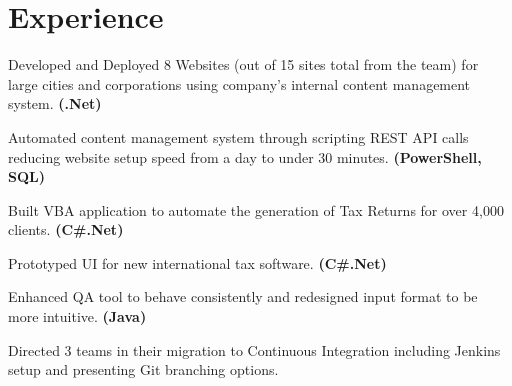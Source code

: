 \documentclass[letterpaper]{kevin-resume} %
\begin{document}
\hfill
%
%
\begin{minipage}[t]{0.66\textwidth} %


\section{Experience}

\vspace{\topsep} %
\begin{tightitemize}
	\item Developed and Deployed 8 Websites (out of 15 sites total from the team) for large cities and corporations using company's internal content management system. \textbf{(.Net)}
	\item Automated content management system through scripting REST API calls reducing website setup speed from a day to under 30 minutes. \textbf{(PowerShell, SQL)}
\end{tightitemize}

\sectionspace %


\begin{tightitemize}
	\item Built VBA application to automate the generation of Tax Returns for over 4,000 clients. \textbf{(C\#.Net)}
	\item Prototyped UI for new international tax software. \textbf{(C\#.Net)}
\end{tightitemize}

\sectionspace %


\begin{tightitemize}
	\item Enhanced QA tool to behave consistently and redesigned input format to be more intuitive. \textbf{(Java)}
	\item Directed 3 teams in their migration to Continuous Integration including Jenkins setup and presenting Git branching options.
\end{tightitemize}


\end{minipage}
\end{document}
